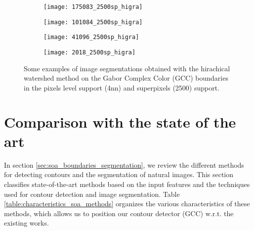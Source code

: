 \begin{figure}[!ht]
    \begin{subfigure}[t]{\textwidth+20pt\relax}
    	\centering
    	\texttt{[image: 175083\_2500sp\_higra]} 
    \end{subfigure}      
    \begin{subfigure}[b]{0.23\textwidth}
    	\centering
        \texttt{[image: 101084\_2500sp\_higra]}
    \end{subfigure}
    \begin{subfigure}[b]{0.23\textwidth}
    	\centering
        \texttt{[image: 41096\_2500sp\_higra]}
    \end{subfigure}
    \begin{subfigure}[b]{0.23\textwidth}
    	\centering
        \texttt{[image: 2018\_2500sp\_higra]}
    \end{subfigure}   
    
	\caption{Some examples of image segmentations obtained with the hirachical watershed method on the Gabor Complex Color (GCC) boundaries in the pixels level support (4nn) and superpixels (2500) support.}\label{fig:GCC_higra_results}    
\end{figure}



\section{Comparison with the state of the art}
In section \ref{sec:soa_boundaries_segmentation}, we review the different methods for detecting contours and the segmentation of natural images. This section classifies state-of-the-art methods based on the input features and the techniques used for contour detection and image segmentation. Table \ref{table:characteristics_soa_methods} organizes the various characteristics of these methods, which allows us to position our contour detector (GCC) w.r.t. the existing works.

